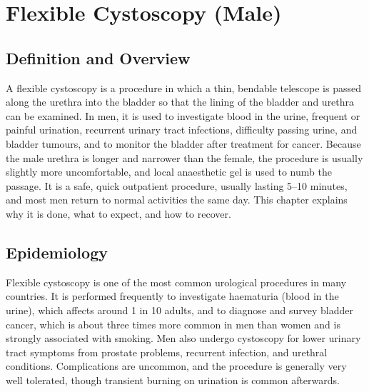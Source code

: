 \chapter{Flexible Cystoscopy (Male)}

\section*{Definition and Overview}
A flexible cystoscopy is a procedure in which a thin, bendable telescope is passed along the urethra into the bladder so that the lining of the bladder and urethra can be examined. In men, it is used to investigate blood in the urine, frequent or painful urination, recurrent urinary tract infections, difficulty passing urine, and bladder tumours, and to monitor the bladder after treatment for cancer. Because the male urethra is longer and narrower than the female, the procedure is usually slightly more uncomfortable, and local anaesthetic gel is used to numb the passage. It is a safe, quick outpatient procedure, usually lasting 5--10 minutes, and most men return to normal activities the same day. This chapter explains why it is done, what to expect, and how to recover.

\section*{Epidemiology}
Flexible cystoscopy is one of the most common urological procedures in many countries. It is performed frequently to investigate haematuria (blood in the urine), which affects around 1 in 10 adults, and to diagnose and survey bladder cancer, which is about three times more common in men than women and is strongly associated with smoking. Men also undergo cystoscopy for lower urinary tract symptoms from prostate problems, recurrent infection, and urethral conditions. Complications are uncommon, and the procedure is generally very well tolerated, though transient burning on urination is common afterwards.

